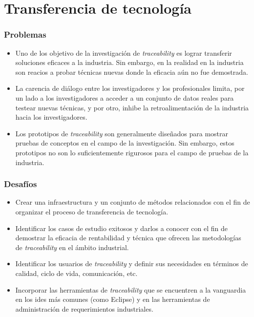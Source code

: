 \documentclass[a4paper,12pt,oneside,spanish]{book}
\begin{document}
\section{Transferencia de tecnología}

\subsubsection{Problemas}

\begin{itemize}[label={$\times$}]

\item Uno de los objetivo de la investigación de \textit{traceability} es lograr transferir soluciones eficaces a la industria. Sin embargo, en la realidad en la industria son reacios a probar técnicas nuevas donde la eficacia aún no fue demostrada.

\item La carencia de diálogo entre los investigadores y los profesionales limita, por un lado a los investigadores a acceder a un conjunto de datos reales para testear nuevas técnicas, y por otro, inhibe la retroalimentación de la industria hacia los investigadores.

\item Los prototipos de \textit{traceability} son generalmente diseñados para mostrar pruebas de conceptos en el campo de la investigación. Sin embargo, estos prototipos no son lo suficientemente rigurosos para el campo de pruebas de la industria.

\end{itemize}

\subsubsection{Desafíos}

\begin{itemize}[label={\checkmark}]

\item Crear una infraestructura y un conjunto de métodos relacionados con el fin de organizar el proceso de transferencia de tecnología.

\item Identificar los casos de estudio exitosos y darlos a conocer con el fin de demostrar la eficacia de rentabilidad y técnica que ofrecen las metodologías de \textit{traceability} en el ámbito industrial.

\item Identificar los usuarios de \textit{traceability} y definir sus necesidades en términos de calidad, ciclo de vida, comunicación, etc.

\item Incorporar las herramientas de \textit{traceability} que se encuentren a la vanguardia en los \glspl{ide} más comunes (como Eclipse) y en las herramientas de administración de requerimientos industriales.

\end{itemize}
\end{document}
